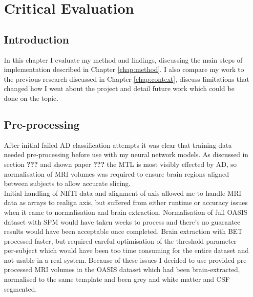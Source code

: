 \documentclass[
    author={Kai Hulme},
    supervisor={Dr Jon Bird},
    degree={BSc},
    title={Generative Adversarial Networks as an Augmentation Technique},
    subtitle={for Alzheimer's Disease Detection in MRI Volumes},
    type={Research},
    year={2021} 
]{dissertation}
\begin{document}

\chapter{Critical Evaluation}
\label{chap:critical_evaluation}


\section{Introduction}

In this chapter I evaluate my method and findings, discussing the main steps of implementation described in Chapter \ref{chap:method}. I also compare my work to the previous research discussed in Chapter \ref{chap:context}, discuss limitations that changed how I went about the project and detail future work which could be done on the topic.


\section{Pre-processing}
	
After initial failed AD classification attempts it was clear that training data needed pre-processing before use with my neural network models. As discussed in section \textbf{???} and shown paper \textbf{???} the MTL is most visibly effected by AD, so normalisation of MRI volumes was required to ensure brain regions aligned between subjects to allow accurate slicing. \\

Initial handling of NIfTI data and alignment of axis allowed me to handle MRI data as arrays to realign axis, but suffered from either runtime or accuracy issues when it came to normalisation and brain extraction. Normalisation of full OASIS dataset with SPM would have taken weeks to process and there's no guarantee results would have been acceptable once completed. Brain extraction with BET processed faster, but required careful optimisation of the threshold parameter per-subject which would have been too time consuming for the entire dataset and not usable in a real system. Because of these issues I decided to use provided pre-processed MRI volumes in the OASIS dataset which had been brain-extracted, normalised to the same template and been grey and white matter and CSF segmented. \\
\end{document}
